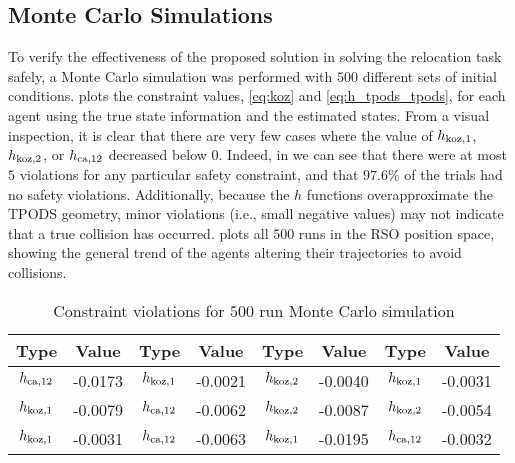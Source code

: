 \subsection{Monte Carlo Simulations}

To verify the effectiveness of the proposed solution in solving the relocation task safely, a Monte Carlo simulation was performed with $500$ different sets of initial conditions.  plots the constraint values, \eqref{eq:koz} and \eqref{eq:h_tpods_tpods}, for each agent using the true state information and the estimated states. From a visual inspection, it is clear that there are very few cases where the value of $h_{{\rm koz},1}$, $h_{{\rm koz},2}$, or $h_{{\rm ca},12}$ decreased below $0$. Indeed, in  we can see that there were at most $5$ violations for any particular safety constraint, and that $97.6\%$ of the trials had no safety violations. Additionally, because the $h$ functions overapproximate the TPODS geometry, minor violations (i.e., small negative values) may not indicate that a true collision has occurred.  plots all $500$ runs in the RSO position space, showing the general trend of the agents altering their trajectories to avoid collisions.

\begin{table}
    \centering
    \begin{tabular}{|c|c|c|c|c|c|c|c|}
    \hline
        Type & Value & Type & Value & Type & Value & Type & Value \\
        \hline
        $h_{{\rm ca},12}$ & -0.0173 & $h_{{\rm koz},1}$ & -0.0021 & $h_{{\rm koz},2}$ & -0.0040 & $h_{{\rm koz},1}$ & -0.0031\\
        $h_{{\rm koz},1}$ & -0.0079 & $h_{{\rm ca},12}$ & -0.0062 & $h_{{\rm koz},2}$ & -0.0087 & $h_{{\rm koz},2}$ & -0.0054\\
        $h_{{\rm koz},1}$ & -0.0031 & $h_{{\rm ca},12}$ & -0.0063 & $h_{{\rm koz},1}$ & -0.0195 & $h_{{\rm ca},12}$ & -0.0032\\
        \hline
    \end{tabular}
    \caption{Constraint violations for $500$ run Monte Carlo simulation}
    \label{tab:MC_collisions}
\end{table}

